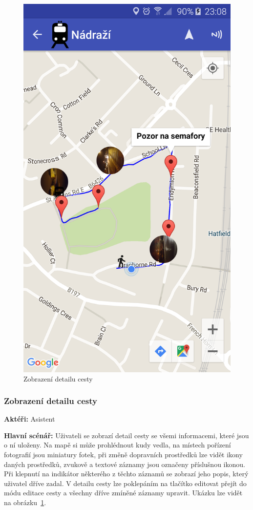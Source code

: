 \documentclass[czech,master,public,dept460,male,java,cpdeclaration]{diploma}
\newcommand{\usecase}[2]{\subsubsection{#1}\label{#2}}
\begin{document}
\begin{figure}[H]
\begin{minipage}{.5\textwidth}
                    \includegraphics[scale=0.14]{img/screen/detailcesty.png}
            \caption{Zobrazení detailu cesty}
            \label{fig:detailasistent}

       \end{minipage}
\end{figure}

\usecase{Zobrazení detailu cesty}{detailasistent}
\textbf{Aktéři:} Asistent

\vspace{0.1cm}
\noindent
\textbf{Hlavní scénář:} Uživateli se zobrazí detail cesty se všemi informacemi, které jsou o ní uloženy.
Na mapě si může prohlédnout kudy vedla, na místech pořízení fotografií jsou miniatury fotek, při změně dopravních
prostředků lze vidět ikony daných prostředků, zvukově a textové záznamy jsou označeny příslušnou ikonou.
Při klepnutí na indikátor některého z těchto záznamů se zobrazí jeho popis, který uživatel dříve zadal.
V detailu cesty lze poklepáním na tlačítko editovat přejít do módu editace cesty a všechny dříve zmíněné
záznamy upravit. Ukázku lze vidět na obrázku~\ref{fig:detailasistent}.
\end{document}

